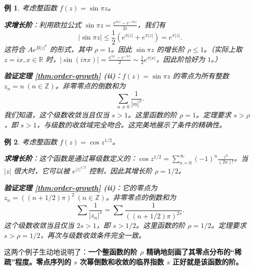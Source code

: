 \documentclass[UTF8]{ctexart}
\newtheorem{example}{例}[section]
\numberwithin{equation}{section}
\newcommand{\RR}{\mathbb{R}}
\begin{document}
\begin{example}
考虑整函数 \(f(z) = \sin \pi z\)。

\textbf{求增长阶}：利用欧拉公式 \(\sin \pi z = \frac{e^{i\pi z} - e^{-i\pi z}}{2i}\)，我们有
\begin{equation}
|\sin \pi z| \le \frac{1}{2} (e^{\pi |z|} + e^{\pi |z|}) = e^{\pi |z|}.
\end{equation}
这符合 \(A e^{B|z|^\rho}\) 的形式，其中 \(\rho = 1\)。因此 \(\sin \pi z\) 的增长阶 \(\rho \le 1\)。（实际上取 \(z = ix, x \in \RR\) 时，\(|\sin(i\pi x)| = \frac{e^{\pi x} - e^{-\pi x}}{2} \sim \frac{1}{2} e^{\pi |x|}\)，因此阶恰好为 \(1\)。）

\textbf{验证定理 \ref{thm:order-growth} (ii)}：\(f(z) = \sin \pi z\) 的零点为所有整数 \(z_n = n \ (n \in \mathbb{Z})\)。非零零点的倒数和为
\begin{equation}
\sum_{n \neq 0} \frac{1}{|n|^s}.
\end{equation}
我们知道，这个级数收敛当且仅当 \(s > 1\)。这里函数的阶 \(\rho = 1\)。定理要求 \(s > \rho\)，即 \(s > 1\)，与级数的收敛域完全吻合。这完美地展示了条件的精确性。
\end{example}

\begin{example}
考虑整函数 \(f(z) = \cos z^{1/2}\)。

\textbf{求增长阶}：这个函数是通过幂级数定义的：\(\cos z^{1/2} = \sum_{n=0}^\infty (-1)^n \frac{z^n}{(2n)!}\)。当 \(|z|\) 很大时，它可以被 \(e^{|z|^{1/2}}\) 控制，因此其增长阶 \(\rho = 1/2\)。

\textbf{验证定理 \ref{thm:order-growth} (ii)}：它的零点为 \(z_n = ((n + 1/2)\pi)^2 \ (n \in \mathbb{Z})\)。非零零点的倒数和为
\begin{equation}
\sum \frac{1}{|z_n|^s} = \sum \frac{1}{((n+1/2)\pi)^{2s}}.
\end{equation}
这个级数收敛当且仅当 \(2s > 1\)，即 \(s > 1/2\)。这里函数的阶 \(\rho = 1/2\)。定理要求 \(s > \rho = 1/2\)，再次与级数收敛条件完全一致。
\end{example}

这两个例子生动地说明了：\textbf{一个整函数的阶 \(\rho\) 精确地刻画了其零点分布的“稀疏”程度。零点序列的 \(s\) 次幂倒数和收敛的临界指数 \(s\) 正好就是该函数的阶。}
\end{document}
